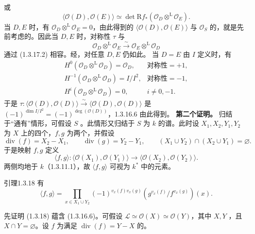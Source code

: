 或
\begin{equation}\langle\mathscr O(D),\mathscr O(E)\rangle\simeq\det\mathrm Rf_*(\mathscr O_D\mathbin{\mathop\otimes^{\mathrm L}}\mathscr O_E).\tag{1.3.17.2}\end{equation}
当 $D,E$ 时，有 $\mathscr O_D\mathbin{\mathop\otimes^{\mathrm L}}\mathscr O_E=0$，由此得到的 $\langle\mathscr O(D),\mathscr O(E)\rangle$ 与 $\mathscr O_S$ 的，就是先前考虑的。因此当 $D,E$ 时，对称性 $\tau$ 与
\[\mathscr O_D\mathbin{\mathop\otimes^{\mathrm L}}\mathscr O_E\xrightarrow\sim\mathscr O_E\mathbin{\mathop\otimes^{\mathrm L}}\mathscr O_D\]
通过 (1.3.17.2) 相容。经，对任意 $D,E$ 仍如此。
当 $D=E$ 由 $I$ 定义时，有
\[\begin{array}{lll}
H^0(\mathscr O_D\mathbin{\mathop\otimes^{\mathrm L}}\mathscr O_D)=\mathscr O_D,&\text{对称性}=+1,\\
H^{-1}(\mathscr O_D\mathbin{\mathop\otimes^{\mathrm L}}\mathscr O_D)=I/I^2,&\text{对称性}=-1,\\
H^i(\mathscr O_D\mathbin{\mathop\otimes^{\mathrm L}}\mathscr O_D)=0,&i\ne0,-1.
\end{array}\]
于是 $\tau:\langle\mathscr O(D),\mathscr O(D)\rangle\xrightarrow\sim\langle\mathscr O(D),\mathscr O(D)\rangle$ 是 $(-1)^{\dim I/I^2}=(-1)^{\deg(\mathscr O(D))}$，1.3.16.6 由此得到。
\textbf{第二个证明。} 归结于“通有”情形，可假设 $S$ 。此情形又归结于 $S$ 为 $k$ 的谱。此时设 $X_1,X_2,Y_1,Y_2$ 为 $X$ 上的四个，$f,g$ 为两个，并假设
\[\operatorname{div}(f)=X_2-X_1,\qquad\operatorname{div}(g)=Y_2-Y_1,\qquad(X_1\cup Y_2)\cap(X_2\cup Y_1)=\varnothing.\]
于是映射 $f,g$ 定义
\[\langle f,g\rangle:\langle\mathscr O(X_1),\mathscr O(Y_1)\rangle\longrightarrow\langle\mathscr O(X_2),\mathscr O(Y_2)\rangle.\]
两侧均地于 $k$（1.3.11.1），故 $\langle f,g\rangle$ 可视为 $k^*$ 中的元素。
\begin{SGAresult}{引理}{1.3.18}
有
\[\langle f,g\rangle=\prod_{x\in X_1\cup Y_2}(-1)^{v_x(f)v_x(g)}(g^{v_x(f)}/f^{v_x(g)})(x).\]
\end{SGAresult}
先证明 (1.3.18) 蕴含 (1.3.16.6)。可假设 $\mathscr L\simeq\mathscr O(X)\simeq\mathscr O(Y)$，其中 $X,Y$ ，且 $X\cap Y=\varnothing$。设 $f$ 为满足 $\operatorname{div}(f)=Y-X$ 的。
